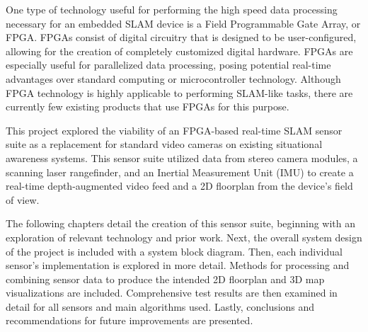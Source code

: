 \par
One type of technology useful for performing the high speed data processing necessary for an embedded SLAM device is a Field Programmable Gate Array, or FPGA. FPGAs consist of digital circuitry that is designed to be user-configured, allowing for the creation of completely customized digital hardware. FPGAs are especially useful for parallelized data processing, posing potential real-time advantages over standard computing or microcontroller technology. Although FPGA technology is highly applicable to performing SLAM-like tasks, there are currently few existing products that use FPGAs for this purpose. 
\par
This project explored the viability of an FPGA-based real-time SLAM sensor suite as a replacement for standard video cameras on existing situational awareness systems. This sensor suite utilized data from stereo camera modules, a scanning laser rangefinder, and an Inertial Measurement Unit (IMU) to create a real-time depth-augmented video feed and a 2D floorplan from the device's field of view.
\par
The following chapters detail the creation of this sensor suite, beginning with an exploration of relevant technology and prior work. Next, the overall system design of the project is included with a system block diagram. Then, each individual sensor’s implementation is explored in more detail. Methods for processing and combining sensor data to produce the intended 2D floorplan and 3D map visualizations are included. Comprehensive test results are then examined in detail for all sensors and main algorithms used. Lastly, conclusions and recommendations for future improvements are presented. 
